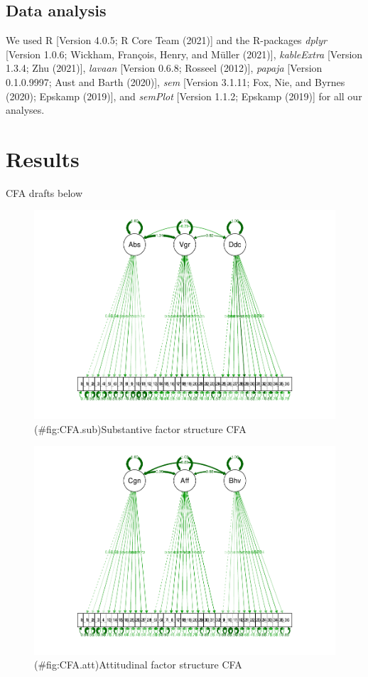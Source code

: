 \documentclass[
  english,
  man]{apa6}
\begin{document}
\hypertarget{data-analysis}{%
\subsection{Data analysis}\label{data-analysis}}

We used R {[}Version 4.0.5; R Core Team (2021){]} and the R-packages \emph{dplyr} {[}Version 1.0.6; Wickham, François, Henry, and Müller (2021){]}, \emph{kableExtra} {[}Version 1.3.4; Zhu (2021){]}, \emph{lavaan} {[}Version 0.6.8; Rosseel (2012){]}, \emph{papaja} {[}Version 0.1.0.9997; Aust and Barth (2020){]}, \emph{sem} {[}Version 3.1.11; Fox, Nie, and Byrnes (2020); Epskamp (2019){]}, and \emph{semPlot} {[}Version 1.1.2; Epskamp (2019){]} for all our analyses.

\hypertarget{results}{%
\section{Results}\label{results}}

CFA drafts below

\begin{figure}
\centering
\includegraphics{SIOPpapaja_files/figure-latex/CFA.sub-1.pdf}
\caption{(\#fig:CFA.sub)Substantive factor structure CFA}
\end{figure}

\begin{figure}
\centering
\includegraphics{SIOPpapaja_files/figure-latex/CFA.att-1.pdf}
\caption{(\#fig:CFA.att)Attitudinal factor structure CFA}
\end{figure}
\end{document}
